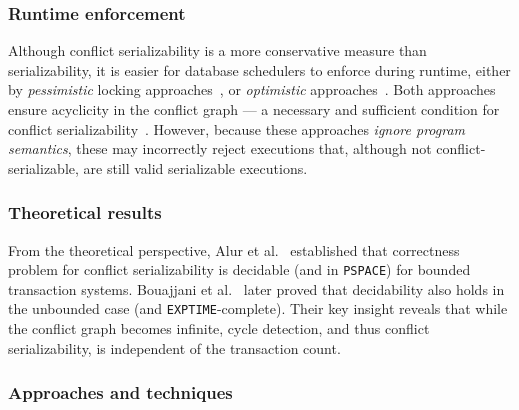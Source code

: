 \subsubsection{Runtime enforcement}
Although conflict serializability is a more conservative measure than 
serializability, it is easier for database schedulers to enforce during 
runtime, either by \textit{pessimistic} locking approaches~\cite{BeHaGo87}, or 
\textit{optimistic} approaches~\cite{KuRo81, BuMo06}.
%
Both approaches ensure acyclicity in the conflict graph --- a necessary and 
sufficient condition for conflict serializability~\cite{SiMa10}. However, 
because these approaches \textit{ignore program semantics}, these may 
incorrectly reject executions that, although not conflict-serializable, are 
still valid serializable executions.
%
%

\subsubsection{Theoretical results}
From the theoretical perspective, Alur et al.~\cite{AlMcPe96} established that 
correctness problem for conflict serializability is decidable (and in 
\texttt{PSPACE}) 
for bounded transaction systems. Bouajjani et al.~\cite{BoEmEnHa13} later 
proved that decidability also holds in the unbounded case (and 
\texttt{EXPTIME}-complete). Their key insight reveals that while the conflict 
graph 
becomes infinite, cycle detection, and thus conflict serializability, is 
independent of the transaction count. 
%
%
\subsubsection{Approaches and techniques}

